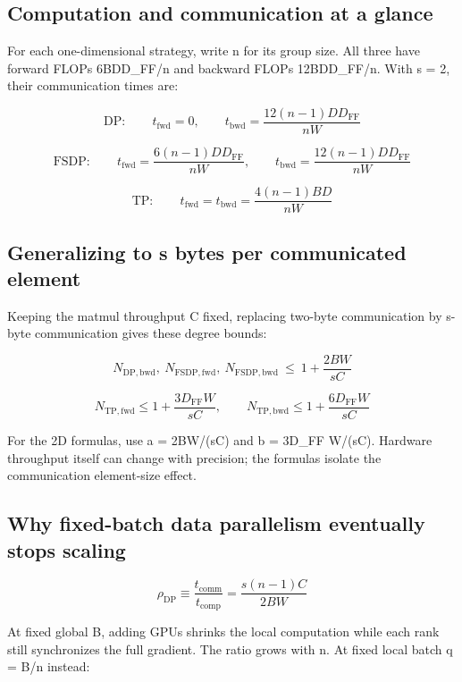 \documentclass[10pt,a4paper]{article}
\begin{document}
\subsection*{Computation and communication at a glance}

For each one-dimensional strategy, write n for its group size. All three have forward FLOPs 6BDD\_FF/n and backward FLOPs 12BDD\_FF/n. With s = 2, their communication times are:\par

\[\mathrm{DP}:\qquad t_{\mathrm{fwd}}=0,\qquad t_{\mathrm{bwd}}=\frac{12(n-1)DD_{\mathrm{FF}}}{nW}\]

\[\mathrm{FSDP}:\qquad t_{\mathrm{fwd}}=\frac{6(n-1)DD_{\mathrm{FF}}}{nW},\qquad t_{\mathrm{bwd}}=\frac{12(n-1)DD_{\mathrm{FF}}}{nW}\]

\[\mathrm{TP}:\qquad t_{\mathrm{fwd}}=t_{\mathrm{bwd}}=\frac{4(n-1)BD}{nW}\]

\subsection*{Generalizing to s bytes per communicated element}

Keeping the matmul throughput C fixed, replacing two-byte communication by s-byte communication gives these degree bounds:\par

\[N_{\mathrm{DP,bwd}},\ N_{\mathrm{FSDP,fwd}},\ N_{\mathrm{FSDP,bwd}}\ \leq\ 1+\frac{2BW}{sC}\]

\[N_{\mathrm{TP,fwd}}\leq 1+\frac{3D_{\mathrm{FF}}W}{sC},\qquad N_{\mathrm{TP,bwd}}\leq 1+\frac{6D_{\mathrm{FF}}W}{sC}\]

{\small For the 2D formulas, use a = 2BW/(sC) and b = 3D\_FF W/(sC). Hardware throughput itself can change with precision; the formulas isolate the communication element-size effect.}\par

\subsection*{Why fixed-batch data parallelism eventually stops scaling}

\[\rho_{\mathrm{DP}}\equiv\frac{t_{\mathrm{comm}}}{t_{\mathrm{comp}}}=\frac{s(n-1)C}{2BW}\]

At fixed global B, adding GPUs shrinks the local computation while each rank still synchronizes the full gradient. The ratio grows with n. At fixed local batch q = B/n instead:\par
\end{document}

